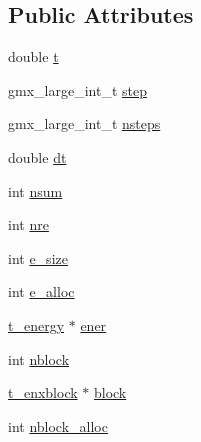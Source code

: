 \subsection*{\-Public \-Attributes}
\begin{DoxyCompactItemize}
\item 
double \hyperlink{structt__enxframe_a2da3140116bb722748bd5bcdeb8b9aa9}{t}
\item 
gmx\-\_\-large\-\_\-int\-\_\-t \hyperlink{structt__enxframe_ae788bc39a8ed8723e3b3aea0f9296d5e}{step}
\item 
gmx\-\_\-large\-\_\-int\-\_\-t \hyperlink{structt__enxframe_a8483da6d1fc1435ddec0a3d0c3df7dc1}{nsteps}
\item 
double \hyperlink{structt__enxframe_a695d4e20dc961d0317a9b1a048e69c63}{dt}
\item 
int \hyperlink{structt__enxframe_ad9aa47102e9e346d5e702652ea7fd35c}{nsum}
\item 
int \hyperlink{structt__enxframe_a9b84dae289b63748af3d56c5fdeea56f}{nre}
\item 
int \hyperlink{structt__enxframe_ae190faa4a8994c8f0d84767739b0ca8a}{e\-\_\-size}
\item 
int \hyperlink{structt__enxframe_ad9e4fa8f127bb08dca6d322ad7db31af}{e\-\_\-alloc}
\item 
\hyperlink{structt__energy}{t\-\_\-energy} $\ast$ \hyperlink{structt__enxframe_a1001463b8aa40fb1e0c227b1f8f1c3f7}{ener}
\item 
int \hyperlink{structt__enxframe_abbaa4b012567563cf02ede4934205cb8}{nblock}
\item 
\hyperlink{structt__enxblock}{t\-\_\-enxblock} $\ast$ \hyperlink{structt__enxframe_adbdf5f9d9a396471b3aa5aee44144e3c}{block}
\item 
int \hyperlink{structt__enxframe_a5b7697c441a52c5fac36254ac2ae45f4}{nblock\-\_\-alloc}
\end{DoxyCompactItemize}


